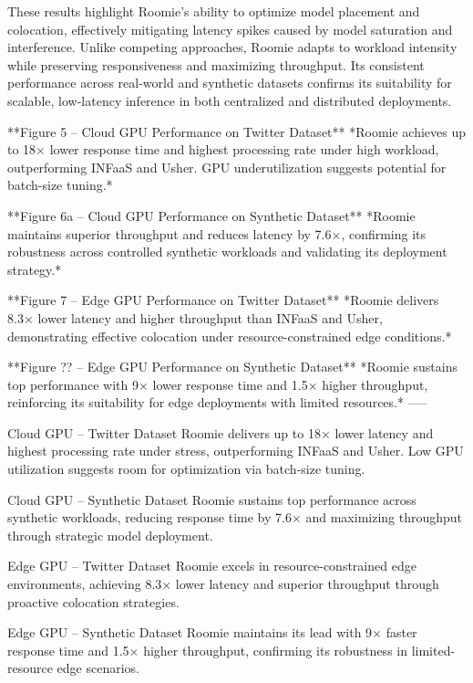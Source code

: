 These results highlight Roomie’s ability to optimize model placement and colocation, effectively mitigating latency spikes caused by model saturation and interference. Unlike competing approaches, Roomie adapts to workload intensity while preserving responsiveness and maximizing throughput. Its consistent performance across real-world and synthetic datasets confirms its suitability for scalable, low-latency inference in both centralized and distributed deployments.











**Figure 5 – Cloud GPU Performance on Twitter Dataset**  
*Roomie achieves up to 18× lower response time and highest processing rate under high workload, outperforming INFaaS and Usher. GPU underutilization suggests potential for batch-size tuning.*

**Figure 6a – Cloud GPU Performance on Synthetic Dataset**  
*Roomie maintains superior throughput and reduces latency by 7.6×, confirming its robustness across controlled synthetic workloads and validating its deployment strategy.*

**Figure 7 – Edge GPU Performance on Twitter Dataset**  
*Roomie delivers 8.3× lower latency and higher throughput than INFaaS and Usher, demonstrating effective colocation under resource-constrained edge conditions.*

**Figure ?? – Edge GPU Performance on Synthetic Dataset**  
*Roomie sustains top performance with 9× lower response time and 1.5× higher throughput, reinforcing its suitability for edge deployments with limited resources.*
-----


Cloud GPU – Twitter Dataset Roomie delivers up to 18× lower latency and highest processing rate under stress, outperforming INFaaS and Usher. Low GPU utilization suggests room for optimization via batch-size tuning.

Cloud GPU – Synthetic Dataset Roomie sustains top performance across synthetic workloads, reducing response time by 7.6× and maximizing throughput through strategic model deployment.

Edge GPU – Twitter Dataset Roomie excels in resource-constrained edge environments, achieving 8.3× lower latency and superior throughput through proactive colocation strategies.

Edge GPU – Synthetic Dataset Roomie maintains its lead with 9× faster response time and 1.5× higher throughput, confirming its robustness in limited-resource edge scenarios.


